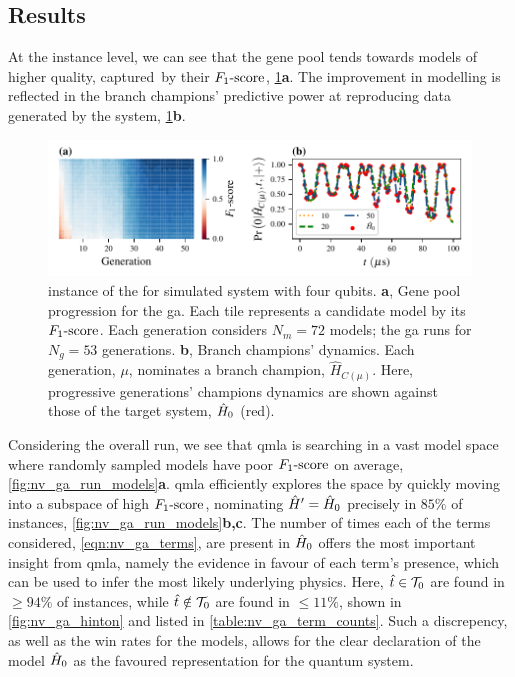 \subsection{Results}
At the \gls{instance} level, we can see that the gene pool tends towards models of higher quality, 
    captured\footnotemark \ by their $ F_{1}\text{-score} $, \cref{fig:nv_ga_instance}\textbf{a}. 
The improvement in modelling is reflected in the branch champions' predictive power at 
    reproducing data generated by the system, \cref{fig:nv_ga_instance}\textbf{b}. 
\begin{figure}
    \begin{center}
        \includegraphics{experimental_study/figures/nv_ga_instance_horiz.pdf}
    \end{center}
    \caption[\Gls{instance} of  for simulated  system with four qubits]{
        \Gls{instance} of the  for simulated  system with four qubits.       
        \textbf{a}, Gene pool progression for the \gls{ga}. Each tile represents a candidate model by its $ F_{1}\text{-score} $. 
        Each generation considers $N_m=72$ models; the \gls{ga} runs for $N_g=53$ generations. 
        \textbf{b}, Branch champions' dynamics. 
        Each generation, $\mu$, nominates a branch champion, $\hat{H}_{C(\mu)}$. 
        Here, progressive generations' champions dynamics are shown against those of the target system, $\hat{H}_0$ (red). 
    }
    \label{fig:nv_ga_instance}
\end{figure}
\par 

Considering the overall \gls{run}, 
    we see that \gls{qmla} is searching in a vast \gls{model space} where randomly sampled models
    have poor $ F_{1}\text{-score} $ on average, \cref{fig:nv_ga_run_models}\textbf{a}. 
\gls{qmla} efficiently explores the space by quickly moving into a 
    subspace of high $ F_{1}\text{-score} $, nominating $\hat{H}^{\prime} = \hat{H}_0$ precisely in $85\%$ of instances,
    \cref{fig:nv_ga_run_models}\textbf{b,c}.
The number of times each of the terms considered, \cref{eqn:nv_ga_terms}, 
    are present in $\hat{H}_0$ offers the most important insight from \gls{qmla}, 
    namely the evidence in favour of each term's presence, 
    which can be used to infer the most likely underlying physics. 
Here, $\hat{t} \in \mathcal{T}_0$ are found in $\geq 94\%$ of instances, 
    while $\hat{t} \notin \mathcal{T}_0$ are found in $\leq 11\%$, 
    shown in \cref{fig:nv_ga_hinton} and listed in \cref{table:nv_ga_term_counts}.
Such a discrepency, as well as the \glspl{win rate} for the models, 
    allows for the clear declaration of the model $\hat{H}_0$ as the favoured representation 
    for the quantum system. 

